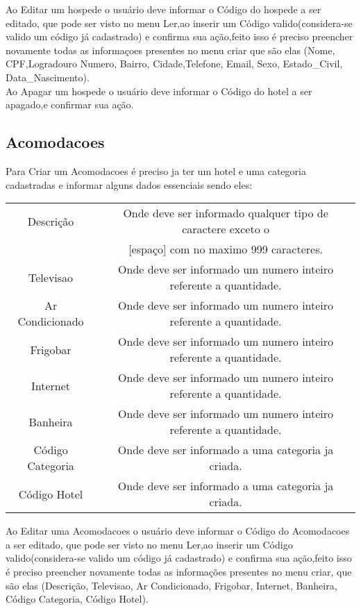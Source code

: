 \documentclass[titlepage]{article}
\begin{document}
				Ao Editar um hospede o usuário deve informar o Código do hospede a ser editado, que pode ser visto no menu Ler,ao inserir um Código valido(considera-se valido um código já cadastrado) e confirma sua ação,feito isso é preciso preencher novamente todas as informaçoes presentes no menu criar que são elas (Nome, CPF,Logradouro
				Numero, Bairro, Cidade,Telefone, Email, Sexo, Estado\_Civil, Data\_Nascimento).\\

				Ao Apagar um hospede o usuário deve informar o Código do hotel a ser apagado,e confirmar sua ação. \\


				\newpage
				\subsection{Acomodacoes}
				Para Criar um Acomodacoes é preciso ja ter um hotel e uma categoria cadastradas e informar alguns dados essenciais sendo eles:\\
				\begin{table}[h]%
					\begin{tabular}{|c|c|}
					\hline
					Descrição & Onde deve ser informado qualquer tipo de caractere exceto o \\& [espaço] com no maximo 999 caracteres.\\
					\hline
					Televisao & Onde deve ser informado um numero inteiro referente a quantidade.\\
					\hline
					Ar Condicionado & Onde deve ser informado um numero inteiro referente a quantidade.\\
					\hline
					Frigobar & Onde deve ser informado um numero inteiro referente a quantidade.\\
					\hline
					Internet & Onde deve ser informado um numero inteiro referente a quantidade.\\
					\hline
					Banheira & Onde deve ser informado um numero inteiro referente a quantidade.\\
					\hline
					Código Categoria & Onde deve ser informado a uma categoria ja criada.\\
					\hline
					Código Hotel & Onde deve ser informado a uma categoria ja criada.\\
					\hline
					\end{tabular}
				\end{table}

				Ao Editar uma Acomodacoes o usuário deve informar o Código do Acomodacoes a ser editado, que pode ser visto no menu Ler,ao inserir um Código valido(considera-se valido um código já cadastrado) e confirma sua ação,feito isso é preciso preencher novamente todas as informações presentes no menu criar, que são elas (Descrição, Televisao, Ar Condicionado, Frigobar, Internet, Banheira, Código Categoria, Código Hotel).\\
\end{document}
